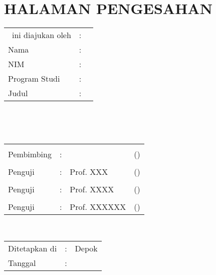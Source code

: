 \chapter*{HALAMAN PENGESAHAN}

\vspace*{0.4cm}
\noindent 

\noindent
\begin{tabular}{ll p{9cm}}
	\type~ini diajukan oleh&: & \\
	Nama&: & \penulis \\
	NIM&: & \npm \\
	Program Studi&: & \program \\
	Judul \type&: & \judul \\
\end{tabular} \\

\vspace*{1.0cm}

\noindent {}\\[0.2cm]

\begin{center}
\end{center}

\vspace*{0.3cm}

\begin{tabular}{l l l l }
	& & & \\
	Pembimbing&: & \pembimbing & (\hspace*{3.0cm}) \\
	& & & \\
	Penguji&: & Prof. XXX & (\hspace*{3.0cm}) \\
	& & & \\
	Penguji&: & Prof. XXXX & (\hspace*{3.0cm}) \\
	& & & \\
	Penguji&: & Prof. XXXXXX & (\hspace*{3.0cm}) \\
\end{tabular}\\


\vspace*{2.0cm}

\begin{tabular}{ll l}
	Ditetapkan di&: & Depok\\
	Tanggal&: & \tanggalLulus \\
\end{tabular}


\newpage